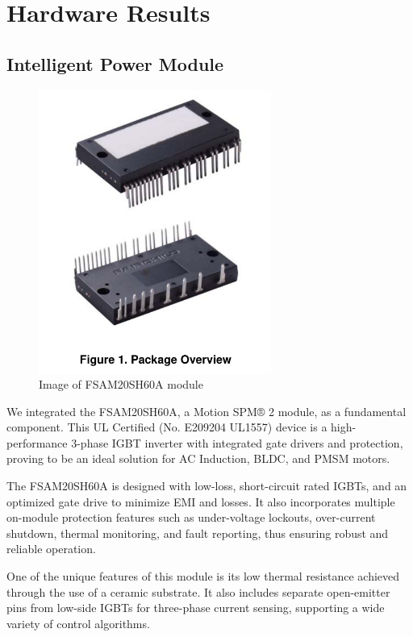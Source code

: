 \section{Hardware Results}

\subsection{Intelligent Power Module}

\begin{figure}[H]
	\centering
	\includegraphics[width=3in]{sections/section4/images/IPM/ipm.png}
	\caption{Image of FSAM20SH60A module}
\end{figure}


We integrated the FSAM20SH60A, a Motion SPM® 2 module, as a fundamental component. This UL Certified (No. E209204 UL1557) device is a high-performance 3-phase IGBT inverter with integrated gate drivers and protection, proving to be an ideal solution for AC Induction, BLDC, and PMSM motors.

The FSAM20SH60A is designed with low-loss, short-circuit rated IGBTs, and an optimized gate drive to minimize EMI and losses. It also incorporates multiple on-module protection features such as under-voltage lockouts, over-current shutdown, thermal monitoring, and fault reporting, thus ensuring robust and reliable operation. 

One of the unique features of this module is its low thermal resistance achieved through the use of a ceramic substrate. It also includes separate open-emitter pins from low-side IGBTs for three-phase current sensing, supporting a wide variety of control algorithms. 

